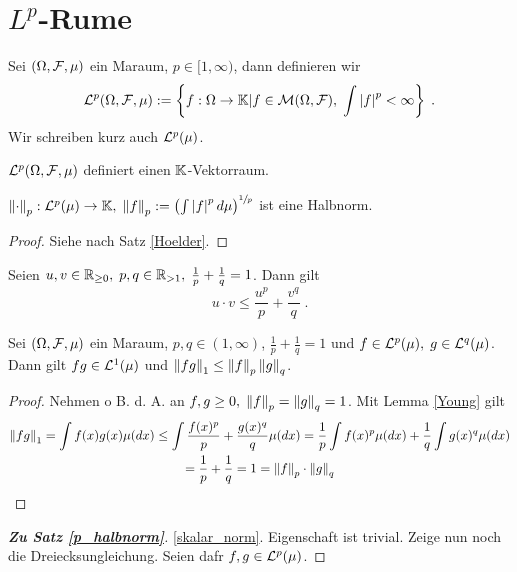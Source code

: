 \section{$L^p$-R\as ume}

\begin{definition}
	Sei \((\Omega, \mathcal{F}, \mu)\) ein Ma\s raum, \(p\in [1,\infty)\), dann definieren wir
	\[\mathcal{L}^p(\Omega, \mathcal{F}, \mu) := \left\{f:\Omega \to \mathbb{K} \vert f\in \mathcal{M}(\Omega, \mathcal{F}), \; \int \left\lvert f \right\rvert^p < \infty\right\}\;.\]
	Wir schreiben kurz auch \(\mathcal{L}^p(\mu)\).
\end{definition}
\begin{rem}
	\(\mathcal{L}^p(\Omega, \mathcal{F}, \mu)\) definiert einen $\mathbb{K}$-Vektorraum.
\end{rem}

\begin{theorem}
	\(\left\lVert\cdot\right\rVert_p: \mathcal{L}^p(\mu) \to \mathbb{K}, \; \left\lVert f\right\rVert_p := \left(\int \left\lvert f \right\rvert^p d \mu\right)^{\sfrac{1}{p}}\) ist eine Halbnorm. \label{p_halbnorm}
\end{theorem}
\begin{proof}
	Siehe nach Satz \ref{Hoelder}.
\end{proof}
\begin{lemma}
	Seien \(u,v \in \mathbb{R}_{\geq 0}, \; p, q \in \mathbb{R}_{>1}, \; \frac{1}{p} + \frac{1}{q} = 1\). Dann gilt
	\[u\cdot v \leq \frac{u^p}{p} + \frac{v^q}{q}\;.\]\label{Young}
\end{lemma}

\begin{theorem}
	Sei \((\Omega, \mathcal{F}, \mu)\) ein Ma\s raum, \(p, q \in (1,\infty)\), \(\frac{1}{p} + \frac{1}{q} = 1\) und \(f\in \mathcal{L}^p(\mu), \;g\in \mathcal{L}^q(\mu)\). Dann gilt \(fg \in \mathcal{L}^1(\mu)\) und \(\left\lVert fg\right\rVert_1 \leq \left\lVert f\right\rVert_p \left\lVert g\right\rVert_q\).
	\label{Hoelder}
\end{theorem}
\begin{proof}
	Nehmen o B. d. A. an \(f,g \geq 0, \; \left\lVert f\right\rVert_p = \left\lVert g\right\rVert_q = 1\). Mit Lemma \ref{Young} gilt
	\begin{multline*}\left\lVert fg\right\rVert_1 = \int f(x) g(x) \mu(dx) \leq \int \frac{f(x)^p}{p} + \frac{g(x)^q}{q}\mu(dx) = \frac{1}{p} \int f(x)^p \mu(dx) + \frac{1}{q} \int g(x)^q \mu(dx) \\= \frac{1}{p} + \frac{1}{q} = 1 = \left\lVert f\right\rVert_p \cdot \left\lVert g\right\rVert_q
	\end{multline*}
\end{proof}

\begin{proof}[\textbf{Zu Satz \ref{p_halbnorm}}]
	\ref{skalar_norm}. Eigenschaft ist trivial.
	Zeige nun noch die Dreiecksungleichung. Seien daf\us r \(f,g \in \mathcal{L}^p(\mu)\).
	
\end{proof}
